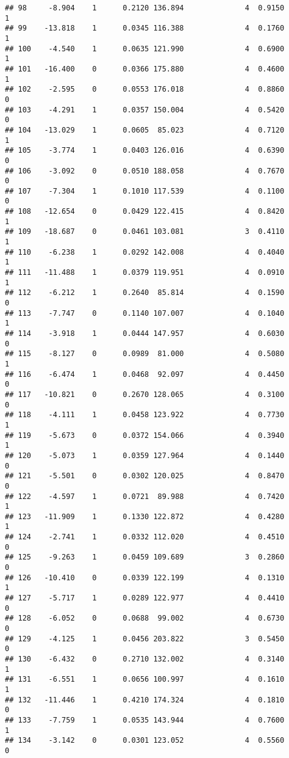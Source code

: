 \documentclass[
]{article}
\begin{document}
\begin{verbatim}
## 98     -8.904    1      0.2120 136.894              4  0.9150      1
## 99    -13.818    1      0.0345 116.388              4  0.1760      1
## 100    -4.540    1      0.0635 121.990              4  0.6900      1
## 101   -16.400    0      0.0366 175.880              4  0.4600      1
## 102    -2.595    0      0.0553 176.018              4  0.8860      0
## 103    -4.291    1      0.0357 150.004              4  0.5420      0
## 104   -13.029    1      0.0605  85.023              4  0.7120      1
## 105    -3.774    1      0.0403 126.016              4  0.6390      0
## 106    -3.092    0      0.0510 188.058              4  0.7670      0
## 107    -7.304    1      0.1010 117.539              4  0.1100      0
## 108   -12.654    0      0.0429 122.415              4  0.8420      1
## 109   -18.687    0      0.0461 103.081              3  0.4110      1
## 110    -6.238    1      0.0292 142.008              4  0.4040      1
## 111   -11.488    1      0.0379 119.951              4  0.0910      1
## 112    -6.212    1      0.2640  85.814              4  0.1590      0
## 113    -7.747    0      0.1140 107.007              4  0.1040      1
## 114    -3.918    1      0.0444 147.957              4  0.6030      0
## 115    -8.127    0      0.0989  81.000              4  0.5080      1
## 116    -6.474    1      0.0468  92.097              4  0.4450      0
## 117   -10.821    0      0.2670 128.065              4  0.3100      0
## 118    -4.111    1      0.0458 123.922              4  0.7730      1
## 119    -5.673    0      0.0372 154.066              4  0.3940      1
## 120    -5.073    1      0.0359 127.964              4  0.1440      0
## 121    -5.501    0      0.0302 120.025              4  0.8470      0
## 122    -4.597    1      0.0721  89.988              4  0.7420      1
## 123   -11.909    1      0.1330 122.872              4  0.4280      1
## 124    -2.741    1      0.0332 112.020              4  0.4510      0
## 125    -9.263    1      0.0459 109.689              3  0.2860      0
## 126   -10.410    0      0.0339 122.199              4  0.1310      1
## 127    -5.717    1      0.0289 122.977              4  0.4410      0
## 128    -6.052    0      0.0688  99.002              4  0.6730      0
## 129    -4.125    1      0.0456 203.822              3  0.5450      0
## 130    -6.432    0      0.2710 132.002              4  0.3140      1
## 131    -6.551    1      0.0656 100.997              4  0.1610      1
## 132   -11.446    1      0.4210 174.324              4  0.1810      0
## 133    -7.759    1      0.0535 143.944              4  0.7600      1
## 134    -3.142    0      0.0301 123.052              4  0.5560      0

\end{verbatim}
\end{document}
